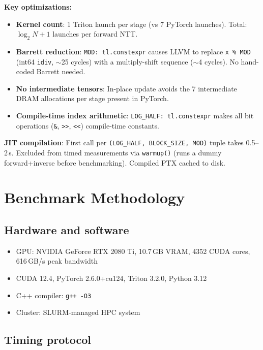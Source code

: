 \documentclass[11pt,a4paper]{article}
\begin{document}
\textbf{Key optimizations:}
\begin{itemize}
  \item \textbf{Kernel count}: 1 Triton launch per stage (vs 7 PyTorch launches).
    Total: $\log_2 N + 1$ launches per forward NTT.
  \item \textbf{Barrett reduction}: \texttt{MOD: tl.constexpr} causes LLVM to replace
    \texttt{x \% MOD} (int64 \texttt{idiv}, $\sim$25 cycles) with a multiply-shift
    sequence ($\sim$4 cycles). No hand-coded Barrett needed.
  \item \textbf{No intermediate tensors}: In-place update avoids the 7 intermediate
    DRAM allocations per stage present in PyTorch.
  \item \textbf{Compile-time index arithmetic}: \texttt{LOG\_HALF: tl.constexpr} makes
    all bit operations (\texttt{\&}, \texttt{>>}, \texttt{<<}) compile-time constants.
\end{itemize}

\textbf{JIT compilation}: First call per \texttt{(LOG\_HALF, BLOCK\_SIZE, MOD)} tuple
takes 0.5--2\,s. Excluded from timed measurements via \texttt{warmup()} (runs a dummy
forward+inverse before benchmarking). Compiled PTX cached to disk.

\section{Benchmark Methodology}

\subsection{Hardware and software}

\begin{itemize}
  \item GPU: NVIDIA GeForce RTX 2080 Ti, 10.7\,GB VRAM, 4352 CUDA cores, 616\,GB/s peak bandwidth
  \item CUDA 12.4, PyTorch 2.6.0+cu124, Triton 3.2.0, Python 3.12
  \item C++ compiler: \texttt{g++ -O3}
  \item Cluster: SLURM-managed HPC system
\end{itemize}

\subsection{Timing protocol}
\end{document}
